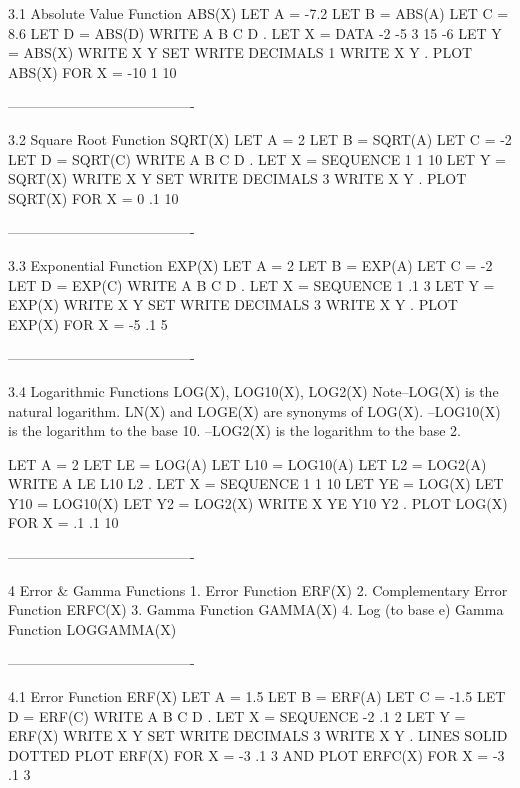 3.1
Absolute Value Function ABS(X)
      LET A = -7.2
      LET B = ABS(A)
      LET C = 8.6
      LET D = ABS(D)
      WRITE A B C D
      .
      LET X = DATA -2 -5 3 15 -6
      LET Y = ABS(X)
      WRITE X Y
      SET WRITE DECIMALS 1
      WRITE X Y
      .
      PLOT ABS(X) FOR X = -10 1 10
 
----------------------------------------
 
3.2
Square Root Function SQRT(X)
      LET A = 2
      LET B = SQRT(A)
      LET C = -2
      LET D = SQRT(C)
      WRITE A B C D
      .
      LET X = SEQUENCE 1 1 10
      LET Y = SQRT(X)
      WRITE X Y
      SET WRITE DECIMALS 3
      WRITE X Y
      .
      PLOT SQRT(X) FOR X = 0 .1 10
 
----------------------------------------
 
3.3
Exponential Function EXP(X)
      LET A = 2
      LET B = EXP(A)
      LET C = -2
      LET D = EXP(C)
      WRITE A B C D
      .
      LET X = SEQUENCE 1 .1 3
      LET Y = EXP(X)
      WRITE X Y
      SET WRITE DECIMALS 3
      WRITE X Y
      .
      PLOT EXP(X) FOR X = -5 .1 5
 
----------------------------------------
 
3.4
Logarithmic Functions LOG(X), LOG10(X), LOG2(X)
Note--LOG(X) is the natural logarithm.
      LN(X) and LOGE(X) are synonyms of LOG(X).
    --LOG10(X) is the logarithm to the base 10.
    --LOG2(X)  is the logarithm to the base 2.
 
      LET A = 2
      LET LE = LOG(A)
      LET L10 = LOG10(A)
      LET L2 = LOG2(A)
      WRITE A LE L10 L2
      .
      LET X = SEQUENCE 1 1 10
      LET YE = LOG(X)
      LET Y10 = LOG10(X)
      LET Y2 = LOG2(X)
      WRITE X YE Y10 Y2
      .
      PLOT LOG(X) FOR X = .1 .1 10
 
----------------------------------------
 
4
Error & Gamma Functions
   1. Error Function ERF(X)
   2. Complementary Error Function ERFC(X)
   3. Gamma Function GAMMA(X)
   4. Log (to base e) Gamma Function LOGGAMMA(X)
 
----------------------------------------
 
4.1
Error Function ERF(X)
      LET A = 1.5
      LET B = ERF(A)
      LET C = -1.5
      LET D = ERF(C)
      WRITE A B C D
      .
      LET X = SEQUENCE -2 .1 2
      LET Y = ERF(X)
      WRITE X Y
      SET WRITE DECIMALS 3
      WRITE X Y
      .
      LINES SOLID DOTTED
      PLOT ERF(X) FOR X = -3 .1 3 AND
      PLOT ERFC(X) FOR X = -3 .1 3
 
